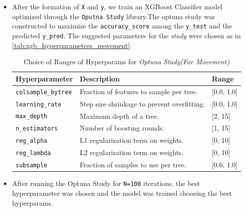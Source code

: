\documentclass{iutbscthesis}
\begin{document}
\begin{itemize}
    \item After the formation of \texttt{X} and \texttt{y}, we train an XGBoost Classifier model optimized through the \verb|Oputna Study| library\cite{akiba2019optuna}.The optuna study was constructed to maximize the \texttt{accuracy\_score}\cite{labatut2012accuracy} among the \texttt{y\_test} and the predicted \texttt{y\_pred}. The suggested parameters for the \textit{study} were chosen as in \autoref{tab:xgb_hyperparameters_movement}:
    \begin{table}[htbp]
    \centering
    \caption{Choice of Ranges of Hyperparams for \textit{Optuna Study(For Movement)} }
    \label{tab:xgb_hyperparameters_movement}
        \begin{tabular}{|l|l|l|}
        \hline
            \textbf{Hyperparameter} & \textbf{Description} & \textbf{Range} \\ \hline
            \texttt{colsample\_bytree} & Fraction of features to sample per tree. & [0.0, 1.0] \\ \hline
            \texttt{learning\_rate} & Step size shrinkage to prevent overfitting. & [0.0, 1.0] \\ \hline
            \texttt{max\_depth} & Maximum depth of a tree. & [2, 15] \\ \hline
            \texttt{n\_estimators} & Number of boosting rounds. & [1, 15] \\ \hline
            \texttt{reg\_alpha} & L1 regularization term on weights. & [0, 10] \\ \hline
            \texttt{reg\_lambda} & L2 regularization term on weights. & [0, 10] \\ \hline
            \texttt{subsample} & Fraction of samples to use per tree. & [0.6, 1.0] \\ \hline
        \end{tabular}
    \end{table}

    \item After running the Optuna Study for \texttt{N=100} iterations, the best hyperparameter was chosen and 
    the model was trained choosing the best hyperparams.
\end{itemize}
\end{document}
